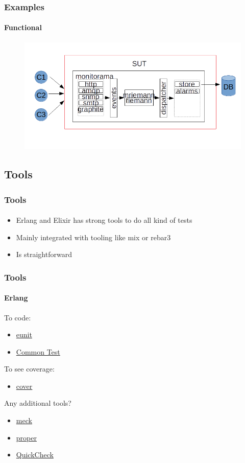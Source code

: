 \documentclass{beamer}
\begin{document}
  \begin{frame}
    \frametitle{Examples}
    \framesubtitle{Functional}
    
    \begin{figure}[t]
    \includegraphics[scale=0.5]{img/ex2.png}
    \centering
    \end{figure}
    
  \end{frame}

  \subsection[Section]{Tools}
      
  \begin{frame}
    \frametitle{Tools}
    \framesubtitle{}
    
    \begin{itemize}[<+->]
    \item Erlang and Elixir has strong tools to do all kind of tests
    \item Mainly integrated with tooling like mix or rebar3
    \item Is straightforward    
    \end{itemize}
  \end{frame}
  
  \begin{frame}
    \frametitle{Tools}
    \framesubtitle{Erlang}
    
    To code:
    \begin{itemize}[<+->]
    \item \href{http://erlang.org/doc/apps/eunit/chapter.html}{eunit}
    \item \href{http://erlang.org/doc/apps/common_test/introduction.html}{Common Test}
    \end{itemize}
    To see coverage:
    \begin{itemize}[<+->]
    \item \href{http://erlang.org/doc/apps/tools/cover_chapter.html}{cover}
    \end{itemize}
    Any additional tools?
    \begin{itemize}[<+->]
    \item \href{https://github.com/eproxus/meck}{meck}
    \item \href{http://proper.softlab.ntua.gr}{proper}
    \item \href{http://www.quviq.com/downloads}{QuickCheck}
    \end{itemize}    
  \end{frame}
    
\end{document}
